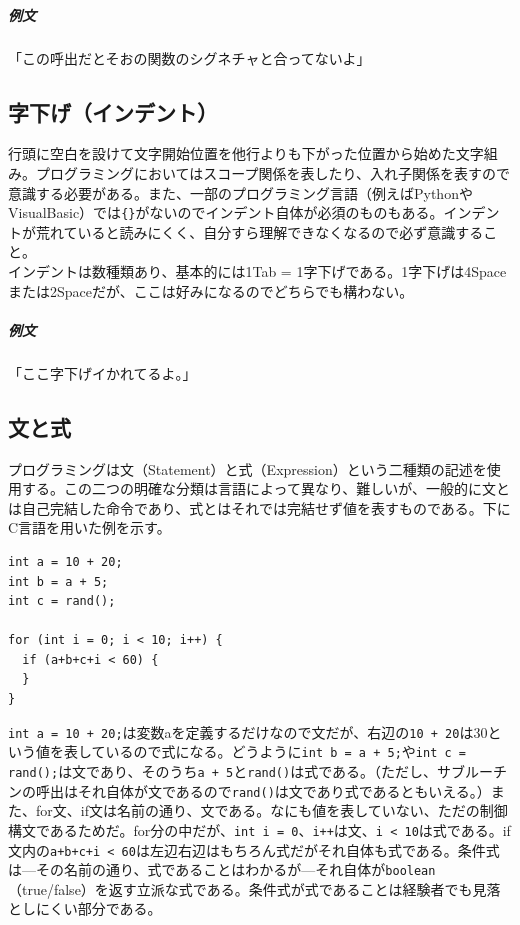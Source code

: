 \documentclass[a4paper]{ltjsreport}
\newcommand{\terlogy}[2][|]{\colorbox{terlogy}{\texttt{\lstinline#1#2#1}}}
\begin{document}
\subparagraph{例文} 「この呼出だとそおの関数のシグネチャと合ってないよ」

\subsection{字下げ（インデント）}
行頭に空白を設けて文字開始位置を他行よりも下がった位置から始めた文字組み。プログラミングにおいてはスコープ関係を表したり、入れ子関係を表すので意識する必要がある。また、一部のプログラミング言語（例えばPythonやVisualBasic）では\terlogy{{}}がないのでインデント自体が必須のものもある。インデントが荒れていると読みにくく、自分すら理解できなくなるので必ず意識すること。
\\

インデントは数種類あり、基本的には1Tab = 1字下げである。1字下げは4Spaceまたは2Spaceだが、ここは好みになるのでどちらでも構わない。

\subparagraph{例文}「ここ字下げイかれてるよ。」

\subsection{文と式}
プログラミングは文（Statement）と式（Expression）という二種類の記述を使用する。この二つの明確な分類は言語によって異なり、難しいが、一般的に文とは自己完結した命令であり、式とはそれでは完結せず値を表すものである。下にC言語を用いた例を示す。


\lstset{language=C}
\begin{lstlisting}
int a = 10 + 20;
int b = a + 5;
int c = rand();

for (int i = 0; i < 10; i++) {
  if (a+b+c+i < 60) {
  }
}
\end{lstlisting}

\terlogy{int a = 10 + 20;}は変数aを定義するだけなので文だが、右辺の\terlogy{10 + 20}は30という値を表しているので式になる。どうように\terlogy{int b = a + 5;}や\terlogy{int c = rand();}は文であり、そのうち\terlogy{a + 5}と\terlogy{rand()}は式である。（ただし、サブルーチンの呼出はそれ自体が文であるので\terlogy{rand()}は文であり式であるともいえる。）また、for文、if文は名前の通り、文である。なにも値を表していない、ただの制御構文であるためだ。for分の中だが、\terlogy{int i = 0}、\terlogy{i++}は文、\terlogy{i < 10}は式である。if文内の\terlogy{a+b+c+i < 60}は左辺右辺はもちろん式だがそれ自体も式である。条件式は---その名前の通り、式であることはわかるが---それ自体が\terlogy{boolean}（true/false）を返す立派な式である。条件式が式であることは経験者でも見落としにくい部分である。
\\
\end{document}
